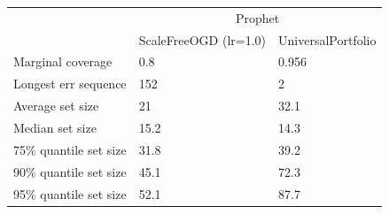 \begin{tabular}{lll}
\toprule
& \multicolumn{2}{c}{Prophet} \\
& ScaleFreeOGD (lr=1.0) & UniversalPortfolio \\
\midrule
Marginal coverage & 0.8 & 0.956 \\
Longest err sequence & 152 & 2 \\
Average set size & 21 & 32.1 \\
Median set size & 15.2 & 14.3 \\
75\% quantile set size & 31.8 & 39.2 \\
90\% quantile set size & 45.1 & 72.3 \\
95\% quantile set size & 52.1 & 87.7 \\
\bottomrule
\end{tabular}
